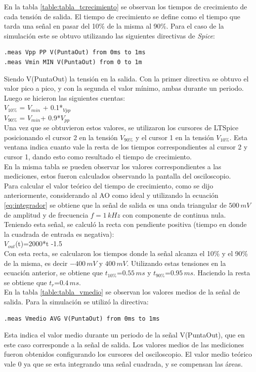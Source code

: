 \documentclass[10pt,spanish,a4paper,openany,notitlepage]{article}
\begin{document}
En la tabla \ref{table:tabla_tcrecimiento} se observan los tiempos de crecimiento de cada tensión de salida. El tiempo de crecimiento se define como el tiempo que tarda una señal en pasar del 10\% de la misma al 90\%. Para el caso de la simulación este se obtuvo utilizando las siguientes directivas de \emph{Spice}:
\begin{verbatim}
.meas Vpp PP V(PuntaOut) from 0ms to 1ms
.meas Vmin MIN V(PuntaOut) from 0 to 1m
\end{verbatim}
Siendo V(PuntaOut) la tensión en la salida. Con la primer directiva se obtuvo el valor pico a
pico, y con la segunda el valor mínimo, ambas durante un periodo. Luego se hicieron las siguientes cuentas:\\
$V_{10\%}$ = $V_{min}$ + 0.1*$_{Vpp}$\\
$V_{90\%}$ = $V_{min}$+ 0.9*$V_{pp}$\\
Una vez que se obtuvieron estos valores, se utilizaron los cursores de LTSpice posicionando
el cursor 2 en la tensión $V_{90\%}$ y el cursor 1 en la tensión $V_{10\%}$. Esta ventana
indica cuanto vale la resta de los tiempos correspondientes al cursor 2 y cursor 1, dando
esto como resultado el tiempo de crecimiento.\\
En la misma tabla se pueden observar los valores correspondientes a las mediciones, estos fueron calculados observando la pantalla del osciloscopio.\\
Para calcular el valor teórico del tiempo de crecimiento, como se dijo anteriormente, considerando al AO como ideal y utilizando la ecuación \ref{eq:integrador} se obtiene que 
la señal de salida es una onda triangular de $500\,\unit{mV}$ de amplitud y de frecuencia 
$f = 1\,\unit{kHz}$ con componente de continua nula. Teniendo esta señal, se calculó la recta con pendiente positiva (tiempo en donde la cuadrada de entrada es negativa):\\
$V_{out}$(t)=2000*t -1.5\\
Con esta recta, se calcularon los tiempos donde la señal alcanza el 10\% y el 90\% de la misma, es decir $-400\,\unit{mV}$ y $400\,\unit{mV}$. Utilizando estas tensiones en la ecuación anterior, se obtiene que $t_{10\%}$=$0.55\,\unit{ms}$ y $t_{90\%}$=$0.95\,\unit{ms}$. Haciendo la resta se obtiene que $t_{r}$=$0.4\,\unit{ms}$.\\

En la tabla \ref{table:tabla_vmedio} se observan los valores medios de la señal de salida. Para la simulación se utilizó la directiva:
\begin{verbatim}
.meas Vmedio AVG V(PuntaOut) from 0ms to 1ms
\end{verbatim}
Esta indica el valor medio durante un periodo de la señal V(PuntaOut), que en este caso corresponde a la señal de salida. Los valores medios de las mediciones fueron obtenidos configurando los cursores del osciloscopio. El valor medio teórico vale 0 ya que se esta integrando una señal cuadrada, y se compensan las áreas.\\
\end{document}
